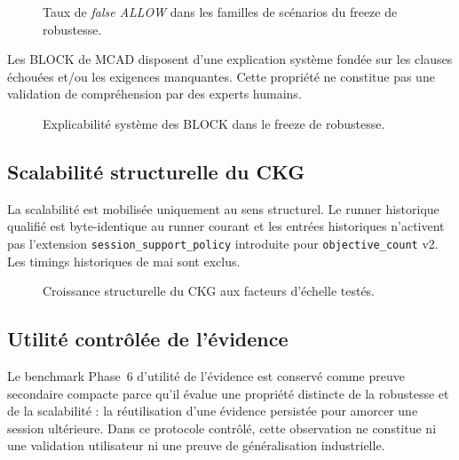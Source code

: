 \begin{figure}[t]
\centering

\caption{Taux de \emph{false ALLOW} dans les familles de scénarios du freeze de robustesse.}
\label{fig:v3-robustness-false-allow}
\end{figure}

Les BLOCK de MCAD disposent d'une explication système fondée sur les clauses
échouées et/ou les exigences manquantes. Cette propriété ne constitue pas une
validation de compréhension par des experts humains.

\begin{figure}[t]
\centering

\caption{Explicabilité système des BLOCK dans le freeze de robustesse.}
\label{fig:v3-robustness-explainability}
\end{figure}

\subsection{Scalabilité structurelle du CKG}

La scalabilité est mobilisée uniquement au sens structurel. Le runner
historique qualifié est byte-identique au runner courant et les entrées
historiques n'activent pas l'extension \texttt{session\_support\_policy}
introduite pour \texttt{objective\_count} v2. Les timings historiques de mai
sont exclus.



\begin{figure}[t]
\centering

\caption{Croissance structurelle du CKG aux facteurs d'échelle testés.}
\label{fig:v3-scalability-structure}
\end{figure}

\subsection{Utilité contrôlée de l'évidence}

Le benchmark Phase~6 d'utilité de l'évidence est conservé comme preuve secondaire compacte parce qu'il évalue une propriété distincte de la robustesse et de la scalabilité : la réutilisation d'une évidence persistée pour amorcer une session ultérieure. Dans ce protocole contrôlé, cette observation ne constitue ni une validation utilisateur ni une preuve de généralisation industrielle.

